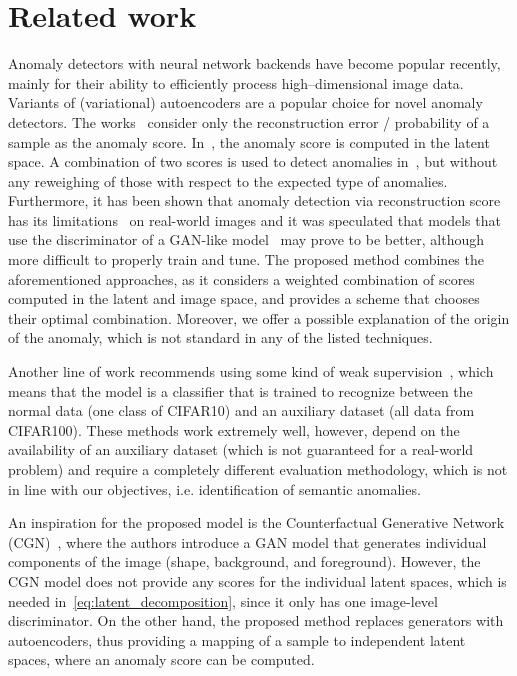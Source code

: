 \section{Related work} \label{sec:related_work}
Anomaly detectors with neural network backends have become popular recently, mainly for their ability to efficiently process high--dimensional image data. Variants of (variational) autoencoders are a popular choice for novel anomaly detectors. The works~\cite{an2015variational, xu2018unsupervised, nguyen2019gee, wang2020advae, kieu2022anomaly} consider only the reconstruction error / probability of a sample as the anomaly score. In~\cite{sun2018learning, zong2018deep, ruff2019deep}, the anomaly score is computed in the latent space. A combination of two scores is used to detect anomalies in~\cite{zimmerer2018context, akccay2019skip}, but without any reweighing of those with respect to the expected type of anomalies. Furthermore, it has been shown that anomaly detection via reconstruction score has its limitations~\cite{larsen2016autoencoding, vskvara2021comparison} on real-world images and it was speculated that models that use the discriminator of a GAN-like model~\cite{schlegl2017unsupervised, schleglFAnoGANFastUnsupervised2019, akcay2018ganomaly, perera2019ocgan, ravanbakhsh2017abnormal, liu2019mogaal, zenati2018adversarially}  may prove to be better, although more difficult to properly train and tune. The proposed method combines the aforementioned approaches, as it considers a weighted combination of scores computed in the latent and image space, and provides a scheme that chooses their optimal combination. Moreover, we offer a possible explanation of the origin of the anomaly, which is not standard in any of the listed techniques.

Another line of work recommends using some kind of weak supervision~\cite{hendrycks2018deep, deecke2021transfer}, which means that the model is a classifier that is trained to recognize between the normal data (one class of CIFAR10) and an auxiliary dataset (all data from CIFAR100). These methods work extremely well, however, depend on the availability of an auxiliary dataset (which is not guaranteed for a real-world problem) and require a completely different evaluation methodology, which is not in line with our objectives, i.e. identification of semantic anomalies.

An inspiration for the proposed model is the Counterfactual Generative Network (CGN)~\cite{sauer2021counterfactual}, where the authors introduce a GAN model that generates individual components of the image (shape, background, and foreground). However, the CGN model does not provide any scores for the individual latent spaces, which is needed in~\eqref{eq:latent_decomposition}, since it only has one image-level discriminator. On the other hand, the proposed method replaces generators with autoencoders, thus providing a mapping of a sample to independent latent spaces, where an anomaly score can be computed.


